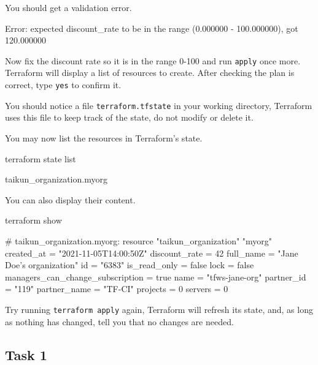 You should get a validation error.
\begin{raw}
Error: expected discount_rate to be in the range (0.000000 - 100.000000), got 120.000000
\end{raw}
Now fix the discount rate so it is in the range 0-100 and run \texttt{apply} once more.
Terraform will display a list of resources to create.
After checking the plan is correct, type \texttt{yes} to confirm it.
\begin{info}
You should notice a file \texttt{terraform.tfstate} in your working directory,
Terraform uses this file to keep track of the state, do not modify or delete it.
\end{info}
You may now list the resources in Terraform's state.
\begin{shell}
terraform state list
\end{shell}
\begin{raw}
taikun_organization.myorg
\end{raw}
You can also display their content.
\begin{shell}
terraform show
\end{shell}
\begin{raw}
# taikun_organization.myorg:
resource "taikun_organization" "myorg" {
    created_at                       = "2021-11-05T14:00:50Z"
    discount_rate                    = 42
    full_name                        = "Jane Doe's organization"
    id                               = "6383"
    is_read_only                     = false
    lock                             = false
    managers_can_change_subscription = true
    name                             = "tfws-jane-org"
    partner_id                       = "119"
    partner_name                     = "TF-CI"
    projects                         = 0
    servers                          = 0
}
\end{raw}
\begin{info}
Try running \texttt{terraform apply} again, Terraform will refresh its state, and, as long as
nothing has changed, tell you that no changes are needed.
\end{info}

\subsection{Task 1}\label{sec:task1}
\blindtext{}
